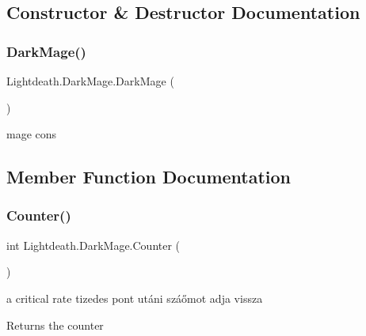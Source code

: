 \subsection{Constructor \& Destructor Documentation}
\hypertarget{class_lightdeath_1_1_dark_mage_ad28ad26a43cdbfc3c446f9add97e49d6}{}\label{class_lightdeath_1_1_dark_mage_ad28ad26a43cdbfc3c446f9add97e49d6} 
\subsubsection{\texorpdfstring{Dark\+Mage()}{DarkMage()}}
{\footnotesize\ttfamily Lightdeath.\+Dark\+Mage.\+Dark\+Mage (\begin{DoxyParamCaption}{ }\end{DoxyParamCaption})\hspace{0.3cm}{\ttfamily [inline]}}



mage cons 



\subsection{Member Function Documentation}
\hypertarget{class_lightdeath_1_1_dark_mage_a5cc5d664d5998b58636e4910ad574d75}{}\label{class_lightdeath_1_1_dark_mage_a5cc5d664d5998b58636e4910ad574d75} 
\subsubsection{\texorpdfstring{Counter()}{Counter()}}
{\footnotesize\ttfamily int Lightdeath.\+Dark\+Mage.\+Counter (\begin{DoxyParamCaption}{ }\end{DoxyParamCaption})\hspace{0.3cm}{\ttfamily [inline]}}



a critical rate tizedes pont utáni száőmot adja vissza 

\begin{DoxyReturn}{Returns}
the counter
\end{DoxyReturn}
\hypertarget{class_lightdeath_1_1_dark_mage_afd47a01c9294fe8bb2aa483f8ce1c3d4}{}\label{class_lightdeath_1_1_dark_mage_afd47a01c9294fe8bb2aa483f8ce1c3d4} 
